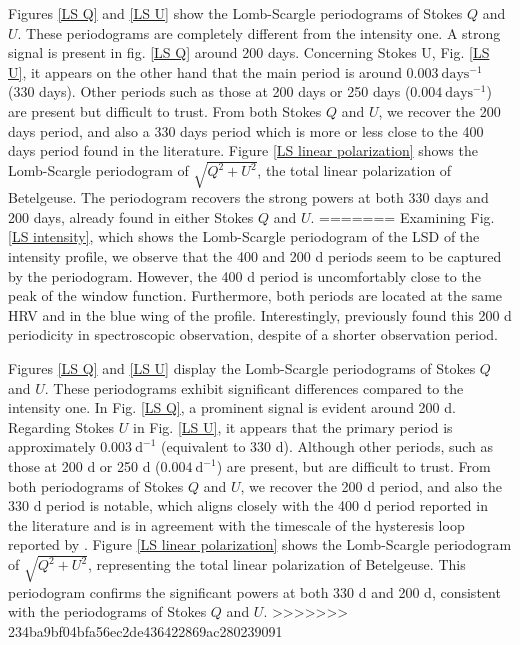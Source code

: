 \documentclass{aa}
\begin{document}
Figures \ref{LS Q} and \ref{LS U} show the Lomb-Scargle periodograms of Stokes $Q$ and $U$. These periodograms are completely different 
from the intensity one. A strong signal is present in fig. \ref{LS Q} around 200 days. Concerning Stokes U, Fig. \ref{LS U}, it appears on the other hand that the main period is around $0.003 \ \mathrm{days^{-1}}$ (330 days). 
Other periods such as those at 200 days or 250 days ($0.004 \ \mathrm{days^{-1}}$) are present but difficult to trust. From both Stokes $Q$ and $U$, we recover the 200 days period, and also a 330 days period which  is more or less close to the 400 days period found in the literature. 
Figure \ref{LS linear polarization} shows the Lomb-Scargle periodogram of $\sqrt{Q^2+U^2}$, the total linear polarization of Betelgeuse. 
The periodogram recovers the strong powers at both 330 days and 200 days, already found in either Stokes $Q$ and $U$. 
=======
Examining Fig.\ref{LS intensity}, which shows the Lomb-Scargle periodogram of the LSD of the intensity profile, we observe that the 400 and 200 d periods seem to be captured by the periodogram. However, the 400 d period is uncomfortably close to the peak of the window function. Furthermore, both periods are located at the same HRV and in the blue wing of the profile. Interestingly, \cite{mathias_evolution_2018} previously found this 200 d periodicity in spectroscopic observation, despite of a shorter observation period. 



Figures \ref{LS Q} and \ref{LS U} display the Lomb-Scargle periodograms of Stokes $Q$ and $U$. These periodograms exhibit significant differences compared to the intensity one. In Fig. \ref{LS Q}, a prominent signal is evident around 200 d. Regarding Stokes $U$ in Fig. \ref{LS U}, it appears that the primary period is approximately $0.003 \ \mathrm{d^{-1}}$ (equivalent to 330 d). Although other periods, such as those at 200 d or 250 d ($0.004 \ \mathrm{d^{-1}}$) are present, but are difficult to trust. From both periodograms of Stokes $Q$ and $U$, we recover the 200 d period, and also the 330 d period is notable, which aligns closely with the 400 d period reported in the literature and is in agreement with the timescale of the hysteresis loop reported by \cite{kravchenko_tomography_2019}.  
Figure \ref{LS linear polarization} shows the Lomb-Scargle periodogram of $\sqrt{Q^2+U^2}$, representing the total linear polarization of Betelgeuse. 
This periodogram confirms the significant powers at both 330 d and 200 d, consistent with the periodograms of Stokes $Q$ and $U$. 
>>>>>>> 234ba9bf04bfa56ec2de436422869ac280239091
\end{document}
